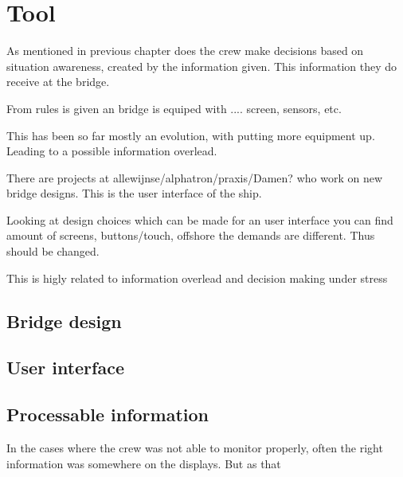 \section{Tool}
As mentioned in previous chapter does the crew make decisions based on situation awareness, created by the information given. This information they do receive at the bridge.

From rules is given an bridge is equiped with .... screen, sensors, etc.

This has been so far mostly an evolution, with putting more equipment up. Leading to a possible information overlead. 

There are projects at allewijnse/alphatron/praxis/Damen? who work on new bridge designs. This is the user interface of the ship.

Looking at design choices which can be made for an user interface you can find amount of screens, buttons/touch, offshore the demands are different. Thus should be changed. 

This is higly related to information overlead and decision making under stress

\subsection{Bridge design}

\subsection{User interface}

\subsection{Processable information}
In the cases where the crew was not able to monitor properly, often the right information was somewhere on the displays. But as that 